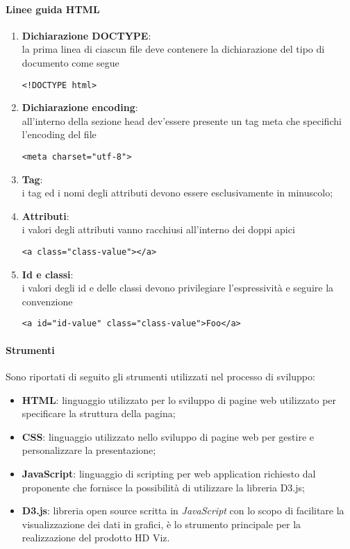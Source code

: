 \paragraph{Linee guida HTML}
\label{par:convenzioni_html}

\begin{enumerate}
	\item \textbf{Dichiarazione DOCTYPE}:\\
		la prima linea di ciascun file deve contenere la dichiarazione del tipo di documento come segue\\
		\begin{lstlisting}[style=html]
			<!DOCTYPE html>
		\end{lstlisting}
	\item \textbf{Dichiarazione encoding}:\\
		all'interno della sezione head dev'essere presente un tag meta che specifichi l'encoding del file
		\begin{lstlisting}[style=html]
			<meta charset="utf-8">
		\end{lstlisting}
	\item \textbf{Tag}:\\
		i tag ed i nomi degli attributi devono essere esclusivamente in minuscolo;
	\item \textbf{Attributi}:\\
		i valori degli attributi vanno racchiusi all'interno dei doppi apici
		\begin{lstlisting}[style=html]
			<a class="class-value"></a>
		\end{lstlisting}
	\item \textbf{Id e classi}:\\
		i valori degli id e delle classi devono privilegiare l'espressività e seguire la convenzione 
		\begin{lstlisting}[style=html]
			<a id="id-value" class="class-value">Foo</a>
		\end{lstlisting}
\end{enumerate}

\paragraph{Strumenti}

Sono riportati di seguito gli strumenti utilizzati nel processo di sviluppo:
\begin{itemize}
	\item \textbf{HTML}: linguaggio utilizzato per lo sviluppo di pagine web utilizzato per specificare la struttura della pagina;
	\item \textbf{CSS}: linguaggio utilizzato nello sviluppo di pagine web per gestire e personalizzare la presentazione;
	\item \textbf{JavaScript}: linguaggio di scripting per web application richiesto dal proponente che fornisce la possibilità di 
		utilizzare la libreria D3.js;
	\item \textbf{D3.js}: libreria open source scritta in \emph{JavaScript} con lo scopo di facilitare la visualizzazione dei dati in 
		grafici, è lo strumento principale per la realizzazione del prodotto HD Viz.
\end{itemize}
